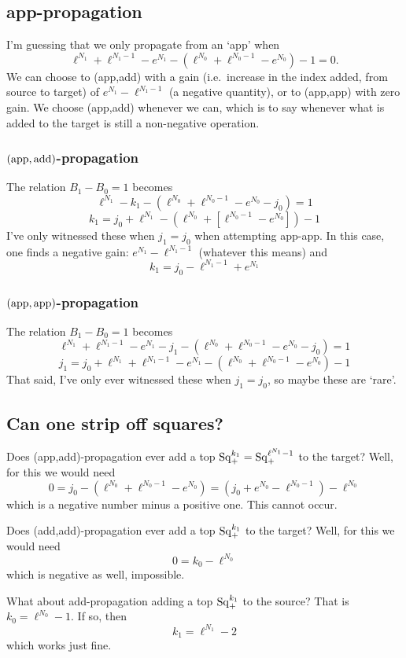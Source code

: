 \documentclass[10pt]{article}
\newcommand{\SqShift}{\Sq_{\smash{+}}}
\newcommand{\Sq}{\mathrm{Sq}}
\begin{document}
\begin{conjectured differentials}
\subsection{app-propagation}
I'm guessing that we only propagate from an `app' when
\[\ell^{N_1}+\ell^{N_1-1}-{e}^{N_1} -(\ell^{N_0}+\ell^{N_0-1}-{e}^{N_0})-1=0.\]
We can choose to (app,add) with a gain (i.e.\ increase in the index added, from source to target) of $e^{N_1}-\ell^{N_1-1}$ (a negative quantity), or to (app,app) with zero gain. We choose (app,add) whenever we can, which is to say whenever what is added to the target is still a non-negative operation.

\subsubsection{$(\textup{app},\textup{add})$-propagation}
The relation $B_1-B_0=1$ becomes
\[\ell^{N_1}-k_1-(\ell^{N_0}+\ell^{N_0-1}-{e}^{N_0}-j_0)=1\]
\[k_1=j_0+\ell^{N_1}-(\ell^{N_0} +[\ell^{N_0-1}-{e}^{N_0}])-1\]
I've only witnessed these when $j_1=j_0$ when attempting app-app. In this case, one finds a negative gain: $e^{N_1}-\ell^{N_1-1}$ (whatever this means) and
\[k_1=j_0-\ell^{N_1-1}+{e}^{N_1}\]

\subsubsection{$(\textup{app},\textup{app})$-propagation}
The relation $B_1-B_0=1$ becomes
\[\ell^{N_1}+\ell^{N_1-1}-{e}^{N_1}-j_1-(\ell^{N_0}+\ell^{N_0-1}-{e}^{N_0}-j_0)=1\]
\[j_1=j_0+\ell^{N_1}+\ell^{N_1-1}-{e}^{N_1} -(\ell^{N_0}+\ell^{N_0-1}-{e}^{N_0})-1\]
That said, I've only ever witnessed these when $j_1=j_0$, so maybe these are `rare'.

\subsection{Can one strip off squares?}
Does (app,add)-propagation ever add a top $\SqShift^{k_1}=\SqShift^{\ell^{N_1}-1}$ to the target? Well, for this we would need
\[0=j_0-(\ell^{N_0}+\ell^{N_0-1}-{e}^{N_0}) =(j_0+e^{N_0}-\ell^{N_0-1})-\ell^{N_0}\]
which is a negative number minus a positive one. This cannot occur.

Does (add,add)-propagation ever add a top $\SqShift^{k_1}$ to the target? Well, for this we would need
\[0=k_0-\ell^{N_0}\]
which is negative as well, impossible.

What about add-propagation adding a top $\SqShift^{k_1}$ to the source? That is $k_0=\ell^{N_0}-1$. If so, then
\[k_1=\ell^{N_1}-2\]
which works just fine.


\end{conjectured differentials}
\end{document}
